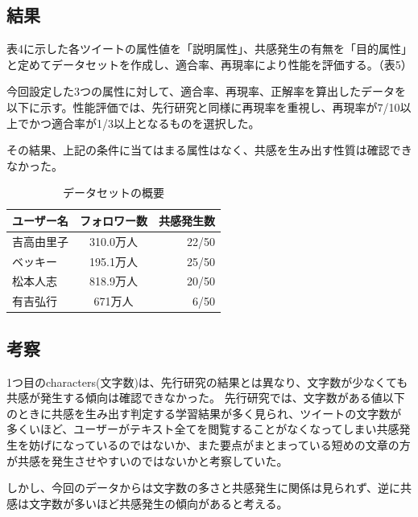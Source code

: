 \documentclass[dvipdfmx]{issj}
\begin{document}
\subsection{結果}  %
表4に示した各ツイートの属性値を「説明属性」、共感発生の有無を「目的属性」と定めてデータセットを作成し、適合率、再現率により性能を評価する。（表5）

今回設定した3つの属性に対して、適合率、再現率、正解率を算出したデータを以下に示す。性能評価では、先行研究と同様に再現率を重視し、再現率が7/10以上でかつ適合率が1/3以上となるものを選択した。

その結果、上記の条件に当てはまる属性はなく、共感を生み出す性質は確認できなかった。



\begin{table}[t]
  \caption{データセットの概要}
  \label{table:data_type}
  \centering
  \begin{tabular}{lcr}
    \hline
   ユーザー名 & フォロワー数  &  共感発生数  \\
    \hline \hline
吉高由里子 & 310.0万人 &  22/50  \\
ベッキー & 195.1万人 &  25/50  \\
松本人志 & 818.9万人 &  20/50  \\
有吉弘行 & 671万人 &  6/50 \\
    \hline
  \end{tabular}
\end{table}




\subsection{考察}  %
1つ目のcharacters(文字数)は、先行研究の結果とは異なり、文字数が少なくても共感が発生する傾向は確認できなかった。
先行研究では、文字数がある値以下のときに共感を生み出す判定する学習結果が多く見られ、ツイートの文字数が多くいほど、ユーザーがテキスト全てを閲覧することがなくなってしまい共感発生を妨げになっているのではないか、また要点がまとまっている短めの文章の方が共感を発生させやすいのではないかと考察していた。

しかし、今回のデータからは文字数の多さと共感発生に関係は見られず、逆に共感は文字数が多いほど共感発生の傾向があると考える。
\end{document}
